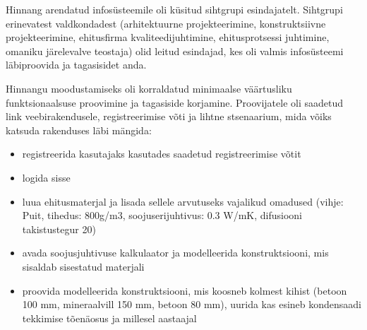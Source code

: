 \label{chapters:feedback}
Hinnang arendatud infosüsteemile oli küsitud sihtgrupi esindajatelt. Sihtgrupi erinevatest valdkondadest (arhitektuurne projekteerimine,
konstruktsiivne projekteerimine, ehitusfirma kvaliteedijuhtimine, ehitusprotsessi juhtimine, omaniku järelevalve teostaja) olid leitud
esindajad, kes oli valmis infosüsteemi läbiproovida ja tagasisidet anda.

Hinnangu moodustamiseks oli korraldatud minimaalse väärtusliku funktsionaalsuse proovimine ja tagasiside korjamine. Proovijatele oli saadetud link
veebirakendusele, registreerimise võti ja lihtne stsenaarium, mida võiks katsuda rakenduses läbi mängida:
\begin{itemize}
    \item registreerida kasutajaks kasutades saadetud registreerimise võtit
    \item logida sisse
    \item luua ehitusmaterjal ja lisada sellele arvutuseks vajalikud omadused (vihje: Puit, tihedus: 800g/m3, 
    soojuserijuhtivus: 0.3 W/mK, difusiooni takistustegur 20)
    \item avada soojusjuhtivuse kalkulaator ja modelleerida konstruktsiooni, mis sisaldab sisestatud materjali
    \item proovida modelleerida konstruktsiooni, mis koosneb kolmest kihist (betoon 100 mm, mineraalvill 150 mm, betoon 80 mm),
    uurida kas esineb kondensaadi tekkimise tõenäosus ja millesel aastaajal
\end{itemize} 


